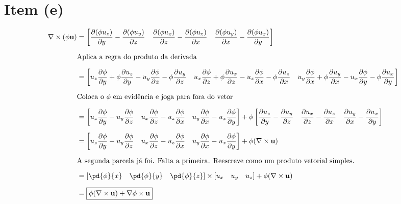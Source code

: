 \section{Item (e)}

\begin{footnotesize}

\begin{align*}
\nabla \times (\phi \mathbf{u})
&=
\left[
\frac{\partial (\phi u_z)}{\partial y} - \frac{\partial (\phi u_y)}{\partial z} \quad
\frac{\partial (\phi u_x)}{\partial z} - \frac{\partial (\phi u_z)}{\partial x} \quad
\frac{\partial (\phi u_y)}{\partial x} - \frac{\partial (\phi u_x)}{\partial y}
\right]
\\[6pt]
& \text{Aplica a regra do produto da derivada}
\\[6pt]
&=
\left[
u_z \frac{\partial \phi}{\partial y} + \phi \frac{\partial u_z}{\partial y}
- u_y \frac{\partial \phi}{\partial z} - \phi \frac{\partial u_y}{\partial z} \quad
u_x \frac{\partial \phi}{\partial z} + \phi \frac{\partial u_x}{\partial z}
- u_z \frac{\partial \phi}{\partial x} - \phi \frac{\partial u_z}{\partial x} \quad
u_y \frac{\partial \phi}{\partial x} + \phi \frac{\partial u_y}{\partial x}
- u_x \frac{\partial \phi}{\partial y} - \phi \frac{\partial u_x}{\partial y}
\right]
\\[6pt]
& \text{Coloca o $\phi$ em evidência e joga para fora do vetor}
\\[6pt]
&=
\left[
u_z \frac{\partial \phi}{\partial y} - u_y \frac{\partial \phi}{\partial z} \quad
u_x \frac{\partial \phi}{\partial z} - u_z \frac{\partial \phi}{\partial x} \quad
u_y \frac{\partial \phi}{\partial x} - u_x \frac{\partial \phi}{\partial y}
\right] +
\phi
\left[
\frac{\partial u_z}{\partial y} - \frac{\partial u_y}{\partial z} \quad
\frac{\partial u_x}{\partial z} - \frac{\partial u_z}{\partial x} \quad
\frac{\partial u_y}{\partial x} - \frac{\partial u_x}{\partial y}
\right]
\\[6pt]
&=
\left[
u_z \frac{\partial \phi}{\partial y} - u_y \frac{\partial \phi}{\partial z} \quad
u_x \frac{\partial \phi}{\partial z} - u_z \frac{\partial \phi}{\partial x} \quad
u_y \frac{\partial \phi}{\partial x} - u_x \frac{\partial \phi}{\partial y}
\right] + \phi (\nabla \times \mathbf{u})
\\[6pt]
& \text{A segunda parcela já foi. Falta a primeira. Reescreve como um produto vetorial simples.}
\\[6pt]
&=
\left[
\pd{\phi}{x} \quad \pd{\phi}{y} \quad \pd{\phi}{z}
\right] \times \left[ 
    u_x \quad u_y \quad u_z
 \right] + \phi (\nabla \times \mathbf{u})
\\[6pt]
&= \boxed{\phi (\nabla \times \mathbf{u}) + \nabla \phi \times \mathbf{u}} 
\end{align*}
\end{footnotesize}

